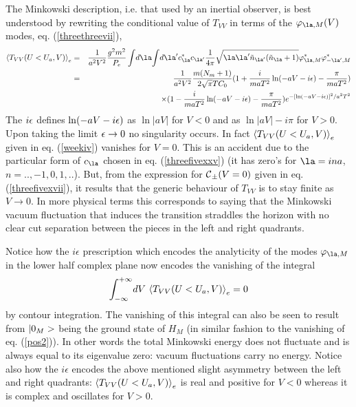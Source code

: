 The Minkowski description, i.e. that used by an inertial observer, is best
understood by rewriting the conditional value of $T_{VV}$ in terms of the
$\varphi_{\la,M}(V)$ modes, eq. (\ref{threethreevii}),
\begin{eqnarray}
 \bk{T_{VV}(U<U_a,V)}_{e}
&=& {1 \over a^2 V^2}{ g^2 m^2 \over P_{e}} \int\! d\la \!\int
\!d\la^\prime c_\la^* c_{\la^\prime}
{1 \over 4 \pi} \sqrt{  \la \la^\prime
\tilde n_{\la^\prime} ( \tilde n_\la +1)
}
 \varphi^*_{\la,M}
\varphi^*_{-\la^\prime,M}
\nonumber\\ &=&
{1 \over a^2 V^2} {m (N_m + 1)\over  2
\sqrt{\pi} T C_0}( 1 + {i \over m a T^2} \ln (-aV-i\e) -{ \pi \over m a T^2})
\nonumber\\  &\ &
 \times  ( 1 - {i \over m a T^2} \ln (-aV-i\e) -{ \pi
\over m a T^2}) e^{-\left[ \ln (-aV-i\epsilon) \right]^2 / a^2 T^2}
\label{weekiv}
\end{eqnarray}
The $i \mbox{$ \epsilon $}$  defines
$\ln (-aV-i\mbox{$ \epsilon $})$ as $\ln \vert aV \vert $ for $V<0$ and as
$\ln \vert aV \vert
- i \pi$ for $V>0$. Upon taking the limit $\mbox{$ \epsilon $}
\rightarrow 0$ no singularity occurs.
In fact
$\mbox{$ \langle T_{VV}(U<U_a,V) \rangle $}_{e}$ given in eq. (\ref{weekiv}) vanishes for $V=0$.
This is an accident due to the particular form of $c_\la$ chosen in
eq. (\ref{threefivexxv}) (it has
zero's for $\la=i n a$, $n= ..,-1,0,1,..$).
But, from the expression for $\mbox{$\cal C $}_{\pm} (V=0)$ given
in eq. (\ref{threefivexvii}), it
results that the generic behaviour of $T_{VV}$ is to stay finite as $V
\to 0$. In more physical terms this corresponds to saying
that
the Minkowski vacuum fluctuation that induces the transition straddles
the
horizon with no clear cut separation between the pieces in the left and
right
quadrants.


Notice how the $i\epsilon$ prescription which encodes the analyticity of the
modes $\varphi_{\la,M}$ in the lower half complex plane now encodes the
vanishing of the integral
\begin{equation}
\int_{-\infty}^{+\infty}\!dV\
 \mbox{$ \langle T_{VV}(U<U_a,V) \rangle $}_{e} =0
\label{vanenf}\end{equation}
by contour integration. The vanishing of this
integral can also be seen to result from $\mbox{$ \vert 0_M > $}$ being the ground state
of $H_M$ (in similar fashion to the vanishing of eq. (\ref{pos2})).
In other words the total
Minkowski energy does
not fluctuate and is always equal to its eigenvalue zero: vacuum
fluctuations carry no energy.
Notice also how the $i\epsilon$ encodes the above mentioned
slight asymmetry between the left
 and right quadrants: $\mbox{$ \langle T_{VV}(U<U_a,V) \rangle $}_{e}$ is real and
positive for $V<0$ whereas it is complex and oscillates for $V>0$.

